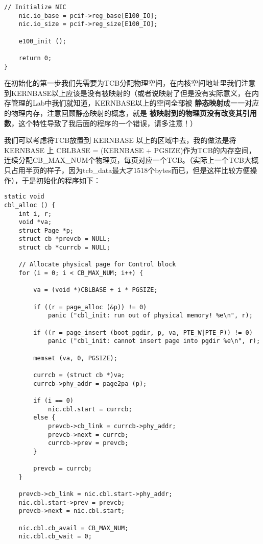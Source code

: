 \documentclass{article}
\newcommand{\highlight}[1]{{\bfseries \color{red}  #1}}
\begin{document}
\begin{CJK*}{UTF8}{gkai}
\begin{lstlisting}[style=ccode, title={\scriptsize \ttfamily \bfseries kern/e100.c}]
    // Initialize NIC
    nic.io_base = pcif->reg_base[E100_IO];
    nic.io_size = pcif->reg_size[E100_IO];

    e100_init ();

    return 0;
}
\end{lstlisting}

在初始化的第一步我们先需要为TCB分配物理空间，在内核空间地址里我们注意到KERNBASE以上应该是没有被映射的（或者说映射了但是没有实际意义，在内存管理的Lab中我们就知道，KERNBASE以上的空间全部被\highlight{静态映射}成一一对应的物理内存，注意回顾静态映射的概念，就是\highlight{被映射到的物理页没有改变其引用数}，这个特性导致了我后面的程序的一个错误，请多注意！）

我们可以考虑将TCB放置到 KERNBASE 以上的区域中去，我的做法是将 KERNBASE 上 CBLBASE = (KERNBASE + PGSIZE)作为TCB的内存空间，连续分配CB\_MAX\_NUM个物理页，每页对应一个TCB。（实际上一个TCB大概只占用半页的样子，因为tcb\_data最大才1518个bytes而已，但是这样比较方便操作），于是初始化的程序如下：


\begin{lstlisting}[style=ccode, title={\scriptsize \ttfamily \bfseries kern/e100.c: cbl\_alloc()}]
static void
cbl_alloc () {
    int i, r;
    void *va;
    struct Page *p;
    struct cb *prevcb = NULL;
    struct cb *currcb = NULL;

    // Allocate physical page for Control block
    for (i = 0; i < CB_MAX_NUM; i++) {

        va = (void *)CBLBASE + i * PGSIZE;

        if ((r = page_alloc (&p)) != 0)
            panic ("cbl_init: run out of physical memory! %e\n", r);

        if ((r = page_insert (boot_pgdir, p, va, PTE_W|PTE_P)) != 0)
            panic ("cbl_init: cannot insert page into pgdir %e\n", r);

        memset (va, 0, PGSIZE);

        currcb = (struct cb *)va;
        currcb->phy_addr = page2pa (p);

        if (i == 0)
            nic.cbl.start = currcb;
        else {
            prevcb->cb_link = currcb->phy_addr;
            prevcb->next = currcb;
            currcb->prev = prevcb;
        }

        prevcb = currcb;
    }

    prevcb->cb_link = nic.cbl.start->phy_addr;
    nic.cbl.start->prev = prevcb;
    prevcb->next = nic.cbl.start;

    nic.cbl.cb_avail = CB_MAX_NUM;
    nic.cbl.cb_wait = 0;


\end{lstlisting}
\end{CJK*}
\end{document}
